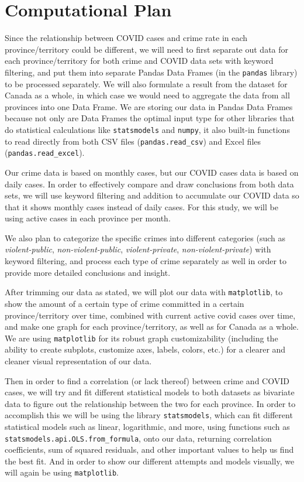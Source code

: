 \documentclass[fontsize=11pt]{article}
\begin{document}
\section{Computational Plan}
Since the relationship between COVID cases and crime rate in each province/territory could be different, we will need to first separate out data for each province/territory for both crime and COVID data sets with keyword filtering, and put them into separate Pandas Data Frames (in the \verb+pandas+ library) to be processed separately. We will also formulate a result from the dataset for Canada as a whole, in which case we would need to aggregate the data from all provinces into one Data Frame. We are storing our data in Pandas Data Frames because not only are Data Frames the optimal input type for other libraries that do statistical calculations like \verb+statsmodels+ and \verb+numpy+, it also built-in functions to read directly from both CSV files (\verb+pandas.read_csv+) and Excel files (\verb+pandas.read_excel+).

Our crime data is based on monthly cases, but our COVID cases data is based on daily cases. In order to effectively compare and draw conclusions from both data sets, we will use keyword filtering and addition to accumulate our COVID data so that it shows monthly cases instead of daily cases. For this study, we will be using active cases in each province per month.

We also plan to categorize the specific crimes into different categories (such as \textit{violent-public}, \textit{non-violent-public}, \textit{violent-private}, \textit{non-violent-private}) with keyword filtering, and process each type of crime separately as well in order to provide more detailed conclusions and insight.

After trimming our data as stated, we will plot our data with \verb+matplotlib+, to show the amount of a certain type of crime committed in a certain province/territory over time, combined with current active covid cases over time, and make one graph for each province/territory, as well as for Canada as a whole. We are using \verb+matplotlib+ for its robust graph customizability (including the ability to create subplots, customize axes, labels, colors, etc.) for a clearer and cleaner visual representation of our data.

Then in order to find a correlation (or lack thereof) between crime and COVID cases, we will try and fit different statistical models to both datasets as bivariate data to figure out the relationship between the two for each province. In order to accomplish this we will be using the library \verb+statsmodels+, which can fit different statistical models such as linear, logarithmic, and more, using functions such as \verb+statsmodels.api.OLS.from_formula+, onto our data, returning correlation coefficients, sum of squared residuals, and other important values to help us find the best fit. And in order to show our different attempts and models visually, we will again be using \verb+matplotlib+.
\end{document}
